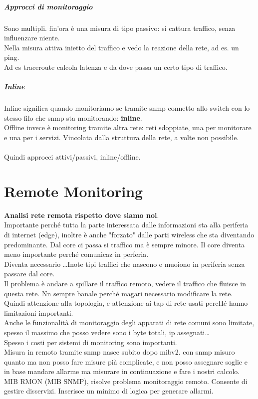 \documentclass[10pt]{book}
\begin{document}
\paragraph{Approcci di monitoraggio} Sono multipli. fin'ora è una misura di tipo passivo: si cattura traffico, senza influenzare niente.\\
Nella misura attiva inietto del traffico e vedo la reazione della rete, ad es. un ping.\\
Ad es traceroute calcola latenza e da dove passa un certo tipo di traffico.\\
\paragraph{Inline} Inline significa quando monitoriamo se tramite snmp connetto allo switch con lo stesso filo che snmp sta monitorando: \textbf{inline}.\\
Offline invece è monitoring tramite altra rete: reti sdoppiate, una per monitorare e una per i servizi. Vincolata dalla struttura della rete, a volte non possibile.\\\\
Quindi approcci attivi/passivi, inline/offline.
\chapter{Remote Monitoring}
\textbf{Analisi rete remota rispetto dove siamo noi}.\\
Importante perché tutta la parte interessata dalle informazioni sta alla periferia di internet (edge), inoltre è anche "forzato" dalle parti wireless che sta diventando predominante. Dal core ci passa si traffico ma è sempre minore. Il core diventa meno importante perché comunicaz in perferia.\\
Diventa necessario \ldots Inote tipi traffici che nascono e muoiono in periferia senza passare dal core.\\
Il problema è andare a spillare il traffico remoto, vedere il traffico che fluisce in questa rete. Nn sempre banale perché magari necessario modificare la rete. Quindi attenzione alla topologia, e attenzione ai tap di rete usati percHé hanno limitazioni importanti.\\
Anche le funzionalità di monitoraggio degli apparati di rete comuni sono limitate, spesso il massimo che posso vedere sono i byte totali, ip assegnati\ldots\\
Spesso i costi per sistemi di monitoring sono importanti.\\
Misura in remoto tramite snmp nasce subito dopo mibv2. con snmp misuro quanto ma non posso fare misure pià complicate, e non posso assegnare soglie e in base mandare allarme ma misurare in continuazione e fare i nostri calcolo.\\
MIB RMON (MIB SNMP), risolve problema monitoraggio remoto. Consente di gestire disservizi. Inserisce un minimo di logica per generare allarmi.
\end{document}
